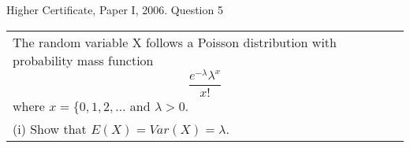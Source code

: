 \documentclass[a4paper,12pt]{article}
\begin{document}
Higher Certificate, Paper I, 2006. Question 5

\begin{table}[ht!]
     
\centering
     
\begin{tabular}{|p{15cm}|}
     
\hline        

\noindent The random variable X follows a Poisson distribution with probability mass function
\[\frac{e^{-\lambda}\lambda^{x}}{x!}\]where $x=\{0,1,2,\ldots$ and $\lambda >0$.\\ \bigskip



(i) Show that $E(X) = Var(X) = \lambda$.
\\ \hline
      
\end{tabular}
    
\end{table}

\end{document}
